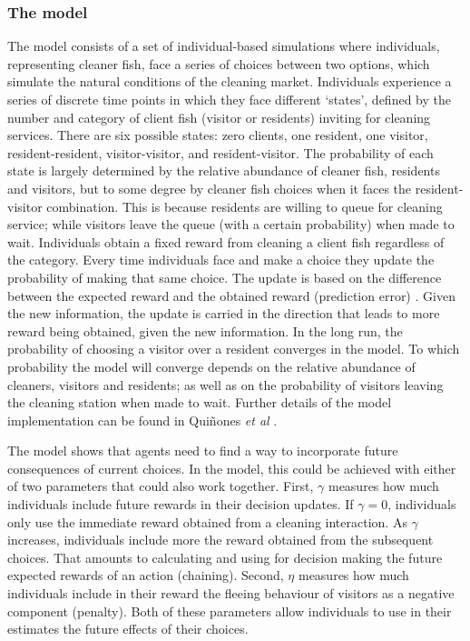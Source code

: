 \documentclass[]{rsos}%
\begin{document}
\hypertarget{the-model}{%
\subsubsection{The model}\label{the-model}}

The model consists of a set of individual-based simulations where
individuals, representing cleaner fish, face a series of choices
between two options, which simulate the natural conditions
of the cleaning market. Individuals experience a series
of discrete time points in which they face different `states',
defined by the number and category of client fish (visitor or residents)
inviting for cleaning services. There are six possible states:
zero clients, one resident, one visitor,
resident-resident, visitor-visitor, and resident-visitor.
The probability of each state is largely determined by the relative
abundance of cleaner fish, residents and visitors, but to some degree by
cleaner fish choices when it faces the resident-visitor combination.
This is because residents are willing to queue for cleaning service;
while visitors leave the queue (with a certain probability) when made to wait.
Individuals obtain a fixed reward from cleaning a client fish
regardless of the category. Every time individuals face and make a choice
they update the probability of making that same choice. The update is
based on the difference between the expected reward and the obtained
reward (prediction error) \citep{sutton_Reinforcement_2018, rescorla_Theory_1972}. Given the new information, the update is carried
in the direction that leads to more reward being obtained, given
the new information. In the long run, the probability of choosing a visitor
over a resident converges in the model. To which probability the model
will converge depends on the relative abundance of cleaners, visitors
and residents; as well as on the probability of visitors leaving the
cleaning station when made to wait. Further details of the model
implementation can be found in Quiñones \emph{et al} \citep{quinones_Reinforcement_2019}.

The model shows that agents need to find a way
to incorporate future consequences of current choices. In the model,
this could be achieved with either of two parameters that could
also work together. First, \(\gamma\) measures how
much individuals include future rewards in their decision updates.
If \(\gamma=0\), individuals only use the immediate reward obtained from a
cleaning interaction. As \(\gamma\) increases, individuals include more the
reward obtained from the subsequent choices. That amounts to calculating
and using for decision making the future expected rewards of an action (chaining).
Second, \(\eta\) measures how much individuals include in their reward the
fleeing behaviour of visitors as a negative component (penalty). Both of
these parameters allow individuals to use in their estimates the future
effects of their choices.
\end{document}
